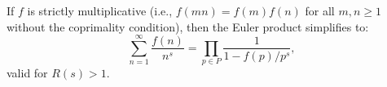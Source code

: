 If $f$ is strictly multiplicative (i.e., $f(mn) = f(m)f(n)$ for all $m, n \geq 1$ without the coprimality condition), then the Euler product simplifies to:
$$
\sum_{n=1}^\infty \frac{f(n)}{n^s} = \prod_{p \in P} \frac{1}{1 - f(p)/p^s},
$$
valid for $R(s) > 1$.
